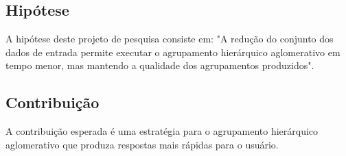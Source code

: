 \subsection{Hipótese}

A hipótese deste projeto de pesquisa consiste em: "A redução do conjunto
dos dados de entrada permite executar o agrupamento hierárquico aglomerativo
em tempo menor, mas mantendo a qualidade dos agrupamentos produzidos".

\subsection{Contribuição}

A contribuição esperada é uma estratégia para o agrupamento hierárquico
aglomerativo que produza respostas mais rápidas para o usuário.  